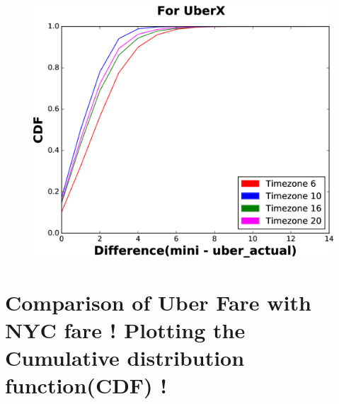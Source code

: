 \documentclass{article}
\begin{document}
\begin{figure}[h!]
\begin{center}
\includegraphics[width=0.7\columnwidth]{figures/three}
\caption{%
}
\end{center}
\end{figure}

\section{Comparison of Uber Fare with NYC fare ! Plotting the Cumulative distribution function(CDF) !}
\end{document}
